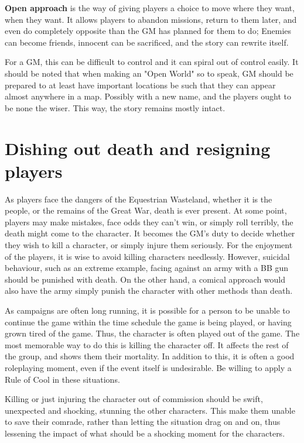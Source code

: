\documentclass[11pt,a4paper,twocolumn]{book}
\begin{document}
    \textbf{Open approach} is the way of giving players a choice to move where they want, when they want. It allows players to abandon missions, return to them later, and even do completely opposite than the GM has planned for them to do; Enemies can become friends, innocent can be sacrificed, and the story can rewrite itself. 
    
    For a GM, this can be difficult to control and it can spiral out of control easily. It should be noted that when making an "Open World" so to speak, GM should be prepared to at least have important locations be such that they can appear almost anywhere in a map. Possibly with a new name, and the players ought to be none the wiser. This way, the story remains mostly intact.
    
    \section*{Dishing out death and resigning players}
    As players face the dangers of the Equestrian Wasteland, whether it is the people, or the remains of the Great War, death is ever present. At some point, players may make mistakes, face odds they can't win, or simply roll terribly, the death might come to the character. It becomes the GM's duty to decide whether they wish to kill a character, or simply injure them seriously. For the enjoyment of the players, it is wise to avoid killing characters needlessly. However, suicidal behaviour, such as an extreme example, facing against an army with a BB gun should be punished with death. On the other hand, a comical approach would also have the army simply punish the character with other methods than death.
    
    As campaigns are often long running, it is possible for a person to be unable to continue the game within the time schedule the game is being played, or having grown tired of the game. Thus, the character is often played out of the game. The most memorable way to do this is killing the character off. It affects the rest of the group, and shows them their mortality. In addition to this, it is often a good roleplaying moment, even if the event itself is undesirable. Be willing to apply a Rule of Cool in these situations.
    
    Killing or just injuring the character out of commission should be swift, unexpected and shocking, stunning the other characters. This make them unable to save their comrade, rather than letting the situation drag on and on, thus lessening the impact of what should be a shocking moment for the characters.
    
\end{document}
